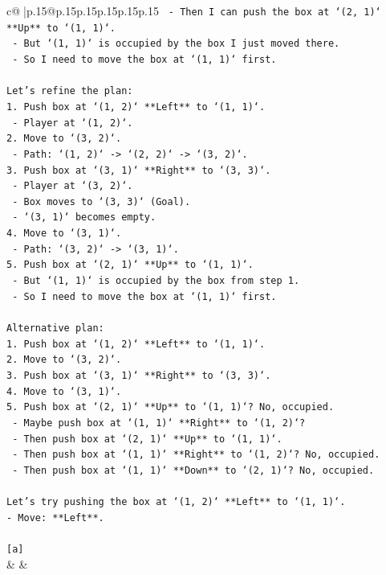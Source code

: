 \documentclass{article}
\begin{document}
{\begin{supertabular}{c@{$\;$}|p{.15\linewidth}@{}p{.15\linewidth}p{.15\linewidth}p{.15\linewidth}p{.15\linewidth}p{.15\linewidth}}
{{{\texttt{    {-} Then I can push the box at `(2, 1)` **Up** to `(1, 1)`.} \\
\texttt{    {-} But `(1, 1)` is occupied by the box I just moved there.} \\
\texttt{    {-} So I need to move the box at `(1, 1)` first.} \\
\\ 
\texttt{Let's refine the plan:} \\
\texttt{1. Push box at `(1, 2)` **Left** to `(1, 1)`.} \\
\texttt{   {-} Player at `(1, 2)`.} \\
\texttt{2. Move to `(3, 2)`.} \\
\texttt{   {-} Path: `(1, 2)` {-}> `(2, 2)` {-}> `(3, 2)`.} \\
\texttt{3. Push box at `(3, 1)` **Right** to `(3, 3)`.} \\
\texttt{   {-} Player at `(3, 2)`.} \\
\texttt{   {-} Box moves to `(3, 3)` (Goal).} \\
\texttt{   {-} `(3, 1)` becomes empty.} \\
\texttt{4. Move to `(3, 1)`.} \\
\texttt{   {-} Path: `(3, 2)` {-}> `(3, 1)`.} \\
\texttt{5. Push box at `(2, 1)` **Up** to `(1, 1)`.} \\
\texttt{   {-} But `(1, 1)` is occupied by the box from step 1.} \\
\texttt{   {-} So I need to move the box at `(1, 1)` first.} \\
\\ 
\texttt{Alternative plan:} \\
\texttt{1. Push box at `(1, 2)` **Left** to `(1, 1)`.} \\
\texttt{2. Move to `(3, 2)`.} \\
\texttt{3. Push box at `(3, 1)` **Right** to `(3, 3)`.} \\
\texttt{4. Move to `(3, 1)`.} \\
\texttt{5. Push box at `(2, 1)` **Up** to `(1, 1)`? No, occupied.} \\
\texttt{   {-} Maybe push box at `(1, 1)` **Right** to `(1, 2)`?} \\
\texttt{   {-} Then push box at `(2, 1)` **Up** to `(1, 1)`.} \\
\texttt{   {-} Then push box at `(1, 1)` **Right** to `(1, 2)`? No, occupied.} \\
\texttt{   {-} Then push box at `(1, 1)` **Down** to `(2, 1)`? No, occupied.} \\
\\ 
\texttt{Let's try pushing the box at `(1, 2)` **Left** to `(1, 1)`.} \\
\texttt{{-} Move: **Left**.} \\
\\ 
\texttt{{[}a{]}} \\
            }
        }
    }
    & & \\ \\


\end{supertabular}}
\end{document}

